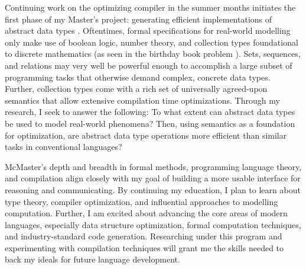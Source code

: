 \documentclass{article}
\begin{document}
Continuing work on the optimizing compiler in the summer months initiates the first phase of my Master's project: generating efficient implementations of abstract data types \cite{hunt2025generating}. Oftentimes, formal specifications for real-world modelling only make use of boolean logic, number theory, and collection types foundational to discrete mathematics (as seen in the birthday book problem \cite{spivey1989birthday}). Sets, sequences, and relations may very well be powerful enough to accomplish a large subset of programming tasks that otherwise demand complex, concrete data types. Further, collection types come with a rich set of universally agreed-upon semantics \cite{griesAndSchneider} that allow extensive compilation time optimizations. Through my research, I seek to answer the following: To what extent can abstract data types be used to model real-world phenomena? Then, using semantics as a foundation for optimization, are abstract data type operations more efficient than similar tasks in conventional languages?

McMaster's depth and breadth in formal methods, programming language theory, and compilation align closely with my goal of building a more usable interface for reasoning and communicating. By continuing my education, I plan to learn about type theory, compiler optimization, and influential approaches to modelling computation. Further, I am excited about advancing the core areas of modern languages, especially data structure optimization, formal computation techniques, and industry-standard code generation. Researching under this program and experimenting with compilation techniques will grant me the skills needed to back my ideals for future language development.

\pagebreak
\nocite{*} %
\printbibliography %
\end{document}
